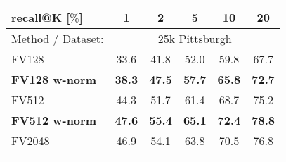
	\begin{tabularx}{0.864\linewidth}{|l|c c c c c|}
		\hline
		\rowcolor{maroon!10}
		recall@K [$\%$] & 1 & 2 & 5 & 10 & 20 \\
		\hline
		\hline 
		\rowcolor{maroon!40}
		Method / Dataset: & \multicolumn{5}{c|}{25k Pittsburgh} \\
		\hline 

		\rowcolor{maroon!10}
		FV128         & 33.6  & 41.8  & 52.0 & 59.8   & 67.7  \\
		\rowcolor{maroon!10}
		\textbf{FV128 w-norm}     & \textbf{38.3}   & \textbf{47.5} & \textbf{57.7} & \textbf{65.8} & \textbf{72.7}  \\
    \hline  
	    \rowcolor{maroon!10}
	    FV512         & 44.3 & 51.7   & 61.4  & 68.7   & 75.2  \\
	    \rowcolor{maroon!10}
	    \textbf{FV512 w-norm}   & \textbf{47.6}  & \textbf{55.4} & \textbf{65.1} & \textbf{72.4} & \textbf{78.8}  \\
	    \hline
		\rowcolor{maroon!10}
		FV2048        & 46.9  & 54.1  & 63.8  & 70.5    & 76.8 \\
		\rowcolor{maroon!10}
	    \rowcolor{maroon!10}

\end{tabularx}
